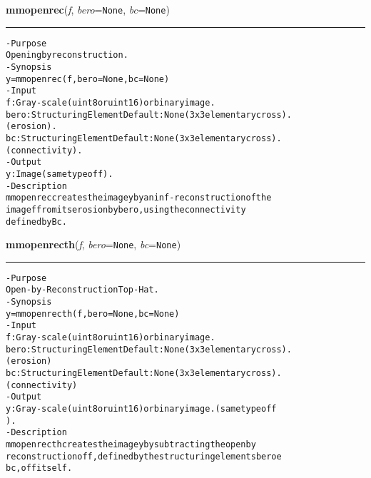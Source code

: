     \begin{boxedminipage}{\textwidth}

    \raggedright \textbf{mmopenrec}(\textit{f}, \textit{bero}=\texttt{N\-o\-n\-e\-}, \textit{bc}=\texttt{N\-o\-n\-e\-})

    \vspace{-1.5ex}

    \rule{\textwidth}{0.5\fboxrule}
\begin{alltt}
- Purpose
    Opening by reconstruction.
- Synopsis
    y = mmopenrec(f, bero=None, bc=None)
- Input
    f:    Gray-scale (uint8 or uint16) or binary image.
    bero: Structuring Element Default: None (3x3 elementary cross).
          (erosion).
    bc:   Structuring Element Default: None (3x3 elementary cross).
          (connectivity).
- Output
    y: Image (same type of f ).
- Description
    mmopenrec creates the image y by an inf-reconstruction of the
    image f from its erosion by bero , using the connectivity
    defined by Bc .\end{alltt}

    \vspace{1ex}

    \end{boxedminipage}

    \label{multireg:num_pymorph:mmopenrecth}
    \vspace{0.5ex}

    \begin{boxedminipage}{\textwidth}

    \raggedright \textbf{mmopenrecth}(\textit{f}, \textit{bero}=\texttt{N\-o\-n\-e\-}, \textit{bc}=\texttt{N\-o\-n\-e\-})

    \vspace{-1.5ex}

    \rule{\textwidth}{0.5\fboxrule}
\begin{alltt}
- Purpose
    Open-by-Reconstruction Top-Hat.
- Synopsis
    y = mmopenrecth(f, bero=None, bc=None)
- Input
    f:    Gray-scale (uint8 or uint16) or binary image.
    bero: Structuring Element Default: None (3x3 elementary cross).
          (erosion)
    bc:   Structuring Element Default: None (3x3 elementary cross).
          ( connectivity)
- Output
    y: Gray-scale (uint8 or uint16) or binary image. (same type of f
       ).
- Description
    mmopenrecth creates the image y by subtracting the open by
    reconstruction of f , defined by the structuring elements bero e
    bc , of f itself.\end{alltt}

    \vspace{1ex}

    \end{boxedminipage}

